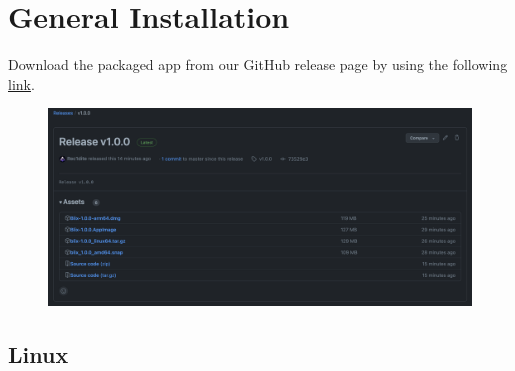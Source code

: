 \documentclass[11pt,a4paper]{article}
\begin{document}
\section*{General Installation}

Download the packaged app from our GitHub release page by using the following 
	\href{https://github.com/COS301-SE-2023/AI-Photo-Editor/releases/tag/v1.0.0}{link}.
\begin{figure}[ht]
	\centering
	\includegraphics[width=1\textwidth,height=\textheight,keepaspectratio,rotate=0,origin=c]{../pics/github-release.png}
\end{figure}

\subsection*{Linux}
\end{document}
